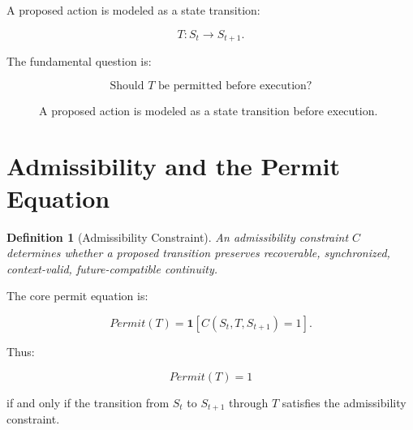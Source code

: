 \documentclass[11pt,a4paper]{article}
\newtheorem{definition}{Definition}
\begin{document}
A proposed action is modeled as a state transition:

\[
T : S_t \rightarrow S_{t+1}.
\]

The fundamental question is:

\[
\text{Should } T \text{ be permitted before execution?}
\]

\begin{figure}[H]
\centering
{}
\caption{A proposed action is modeled as a state transition before execution.}
\end{figure}

\section{Admissibility and the Permit Equation}

\begin{definition}[Admissibility Constraint]
An admissibility constraint \(C\) determines whether a proposed transition preserves recoverable, synchronized, context-valid, future-compatible continuity.
\end{definition}

The core permit equation is:

\[
Permit(T)
=
\mathbf{1}
\left[
C(S_t,T,S_{t+1}) = 1
\right].
\]

Thus:

\[
Permit(T)=1
\]

if and only if the transition from \(S_t\) to \(S_{t+1}\) through \(T\) satisfies the admissibility constraint.
\end{document}

